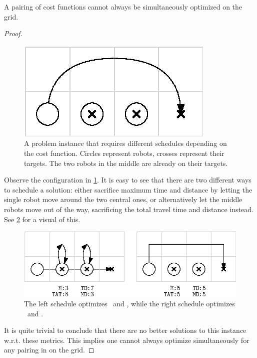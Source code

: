 \begin{lemma}\label{lemma:simultaneous_1}
	A pairing of cost functions  cannot always be simultaneously optimized on the grid.

\begin{proof}

	\begin{figure}[h]
		\centering
		\includegraphics[width=0.35\linewidth]{ipe/sim1_problem.eps}
		\caption{
			A problem instance that requires different schedules depending on the cost function. Circles represent robots, crosses represent their targets. The two robots in the middle are already on their targets. 
		}
		\label{fig:sim1}
	\end{figure}

	Observe the configuration in \cref{fig:sim1}. 
	It is easy to see that there are two different ways to schedule a solution: either sacrifice maximum time and distance by letting the single robot move around the two central ones, or alternatively let the middle robots move out of the way, sacrificing the total travel time and distance instead. 
	See \cref{fig:sim1_strat} for a visual of this. 

	\begin{figure}[h]
		\centering
		\includegraphics[width=0.7\linewidth]{ipe/sim1_strat.eps}
		\caption{
			The left schedule optimizes \ and , while the right schedule optimizes \ and .
		}
		\label{fig:sim1_strat}
	\end{figure}

It is quite trivial to conclude that there are no better solutions to this instance w.r.t. these metrics. 
This implies one cannot always optimize simultaneously for any pairing in  on the grid.
\end{proof}


\end{lemma}
